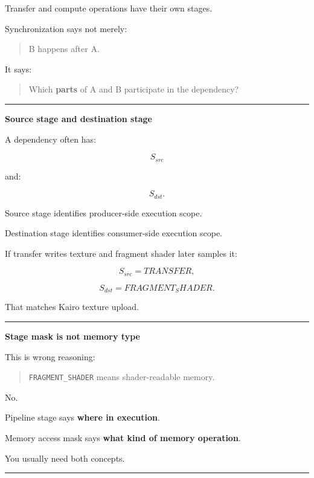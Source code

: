 Transfer and compute operations have their own stages.

Synchronization says not merely:

\begin{quote}
B happens after A.
\end{quote}

It says:

\begin{quote}
Which \textbf{parts} of A and B participate in the dependency?
\end{quote}

\begin{center}\rule{0.5\linewidth}{0.5pt}\end{center}

\textbf{Source stage and destination stage}

A dependency often has:

\[
S_{src}
\]

and:

\[
S_{dst}.
\]

Source stage identifies producer-side execution scope.

Destination stage identifies consumer-side execution scope.

If transfer writes texture and fragment shader later samples it:

\[
S_{src}
=
TRANSFER,
\]

\[
S_{dst}
=
FRAGMENT_SHADER.
\]

That matches Kairo texture upload.

\begin{center}\rule{0.5\linewidth}{0.5pt}\end{center}

\textbf{Stage mask is not memory type}

This is wrong reasoning:

\begin{quote}
\texttt{FRAGMENT\_SHADER} means shader-readable memory.
\end{quote}

No.

Pipeline stage says \textbf{where in execution}.

Memory access mask says \textbf{what kind of memory operation}.

You usually need both concepts.

\begin{center}\rule{0.5\linewidth}{0.5pt}\end{center}

